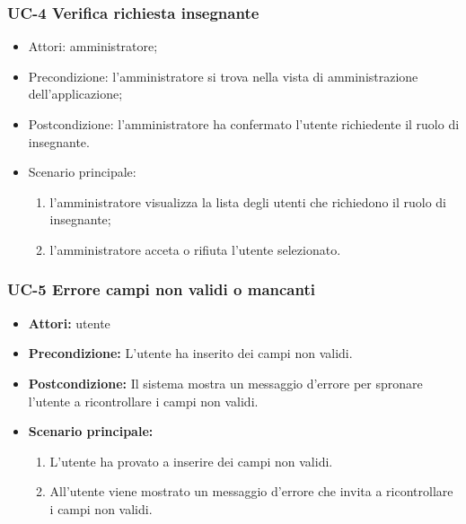\subsubsection{UC-4 Verifica richiesta insegnante}
		\begin{itemize}
			\item Attori: amministratore;
			\item Precondizione: l'amministratore si trova nella vista di amministrazione dell'applicazione;
			\item Postcondizione: l'amministratore ha confermato l'utente richiedente il ruolo di insegnante.
			\item Scenario principale:
				\begin{enumerate}
					\item l'amministratore visualizza la lista degli utenti che richiedono il ruolo di insegnante;
					\item l'amministratore acceta o rifiuta l'utente selezionato.
				\end{enumerate}
		\end{itemize}

\subsubsection{UC-5 Errore campi non validi o mancanti}
\begin{itemize}
\item \textbf{Attori: } utente 
\item \textbf{Precondizione: }L'utente ha inserito dei campi non validi.
\item \textbf{Postcondizione: }Il sistema mostra un messaggio d'errore per spronare l'utente a ricontrollare i campi non validi.
\item \textbf{Scenario principale: }
		\begin{enumerate}
		\item L'utente ha provato a inserire dei campi non validi.
		\item All'utente viene mostrato un messaggio d'errore che invita a ricontrollare i campi non validi.
		\end{enumerate}
\end{itemize}
